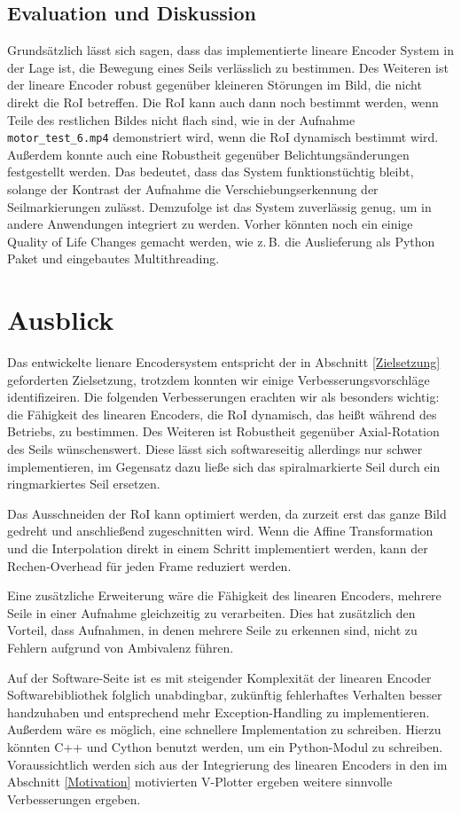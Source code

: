 \documentclass[10pt,a4paper]{scrarticle}
\begin{document}
\subsection{Evaluation und Diskussion}
Grundsätzlich lässt sich sagen, dass das implementierte lineare Encoder System in der Lage ist, die Bewegung eines Seils verlässlich zu bestimmen. Des Weiteren ist der lineare Encoder robust gegenüber kleineren Störungen im Bild, die nicht direkt die RoI betreffen. Die RoI kann auch dann noch bestimmt werden, wenn Teile des restlichen Bildes nicht flach sind, wie in der Aufnahme \texttt{motor\_test\_6.mp4} demonstriert wird, wenn die RoI dynamisch bestimmt wird. Außerdem konnte auch eine Robustheit gegenüber Belichtungsänderungen festgestellt werden. Das bedeutet, dass das System funktionstüchtig bleibt, solange der Kontrast der Aufnahme die Verschiebungserkennung der Seilmarkierungen zulässt.
Demzufolge ist das System zuverlässig genug, um in andere Anwendungen integriert zu werden. Vorher könnten noch ein einige Quality of Life Changes gemacht werden, wie z.\,B. die Auslieferung als Python Paket und eingebautes Multithreading.

\section{Ausblick}
Das entwickelte lienare Encodersystem entspricht der in Abschnitt \ref{Zielsetzung} geforderten Zielsetzung, trotzdem konnten wir einige Verbesserungsvorschläge identifizeiren. Die folgenden Verbesserungen erachten wir als besonders wichtig: die Fähigkeit des linearen Encoders, die RoI dynamisch, das heißt während des Betriebs, zu bestimmen. Des Weiteren ist Robustheit gegenüber Axial-Rotation des Seils wünschenswert. Diese lässt sich softwareseitig allerdings nur schwer implementieren, im Gegensatz dazu ließe sich das spiralmarkierte Seil durch ein ringmarkiertes Seil ersetzen. 

Das Ausschneiden der RoI kann optimiert werden, da zurzeit erst das ganze Bild gedreht und anschließend zugeschnitten wird. Wenn die Affine Transformation und die Interpolation direkt in einem Schritt implementiert werden, kann der Rechen-Overhead für jeden Frame reduziert werden.

 Eine zusätzliche Erweiterung wäre die Fähigkeit des linearen Encoders, mehrere Seile in einer Aufnahme gleichzeitig zu verarbeiten. Dies hat zusätzlich den Vorteil, dass Aufnahmen, in denen mehrere Seile zu erkennen sind, nicht zu Fehlern aufgrund von Ambivalenz führen.

Auf der Software-Seite ist es mit steigender Komplexität der linearen Encoder Softwarebibliothek folglich unabdingbar, zukünftig fehlerhaftes Verhalten besser handzuhaben und entsprechend mehr Exception-Handling zu implementieren. Außerdem wäre es möglich, eine schnellere Implementation zu schreiben. Hierzu könnten C++ und Cython benutzt werden, um ein Python-Modul zu schreiben.
Voraussichtlich werden sich aus der Integrierung des linearen Encoders in den im Abschnitt \ref{Motivation} motivierten V-Plotter ergeben weitere sinnvolle Verbesserungen ergeben.

\appendix


\end{document}
